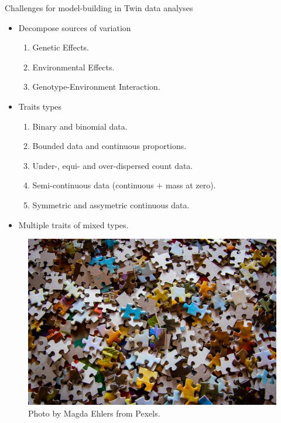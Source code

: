 \documentclass[
  ignorenonframetext,
  serif,
  professionalfont,
  usenames,
  dvipsnames,
  aspectratio = 169]{beamer}
\providecommand{\tightlist}{%
  \setlength{\itemsep}{0pt}\setlength{\parskip}{0pt}}
\renewcommand{\tightlist}{%
  \setlength{\itemsep}{0\baselineskip}
  \setlength{\parskip}{0.25\baselineskip}
}
\def\beginAHalfColumn{\begin{minipage}{0.49\textwidth}}%
\def\endColumns{\end{minipage}}%
\begin{document}
\begin{frame}{Challenges for model-building in Twin data analyses}
\protect\hypertarget{challenges-for-model-building-in-twin-data-analyses}{}
\beginAHalfColumn

\begin{itemize}
\tightlist
\item
  Decompose sources of variation

  \begin{enumerate}
  \tightlist
  \item
    Genetic Effects.
  \item
    Environmental Effects.
  \item
    Genotype-Environment Interaction.
  \end{enumerate}
\item
  Traits types

  \begin{enumerate}
  \tightlist
  \item
    Binary and binomial data.
  \item
    Bounded data and continuous proportions.
  \item
    Under-, equi- and over-dispersed count data.
  \item
    Semi-continuous data (continuous \(+\) mass at zero).
  \item
    Symmetric and assymetric continuous data.
  \end{enumerate}
\item
  Multiple traits of mixed types.
\end{itemize}

\endColumns
\beginAHalfColumn

\begin{figure}

{\centering \includegraphics[width=0.8\linewidth]{./img/blocks} 

}

\caption{Photo by Magda Ehlers from Pexels.}\label{fig:unnamed-chunk-8}
\end{figure}

\endColumns
\end{frame}
\end{document}
